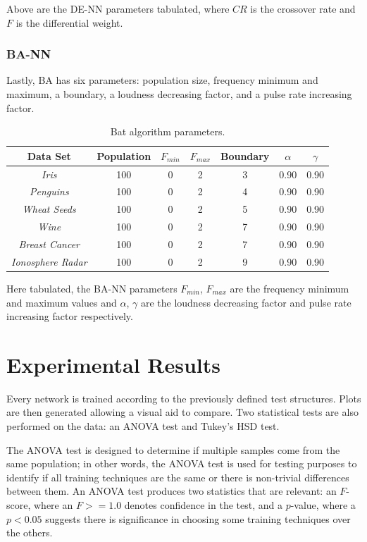\documentclass[a4paper,12pt]{article}
\begin{document}
Above are the DE-NN parameters tabulated, where $CR$ is the crossover rate and $F$ is the differential weight.

\subsubsection{BA-NN}

Lastly, BA has six parameters: population size, frequency minimum and maximum, a boundary, a loudness decreasing factor, and a pulse rate increasing factor.

\begin{table}[h!]
\centering
\begin{tabular}{|c|c|c|c|c|c|c|}
\hline
\textbf{Data Set} & \textbf{Population} & \textbf{$F_{min}$} & \textbf{$F_{max}$} & \textbf{Boundary} & \textbf{$\alpha$} & \textbf{$\gamma$} \\ \hline
\textit{Iris} & 100 & 0 & 2 & 3 & 0.90 & 0.90 \\ \hline
\textit{Penguins} & 100 & 0 & 2 & 4 & 0.90 & 0.90 \\ \hline
\textit{Wheat Seeds} & 100 & 0 & 2 & 5 & 0.90 & 0.90 \\ \hline
\textit{Wine} & 100 & 0 & 2 & 7 & 0.90 & 0.90 \\ \hline
\textit{Breast Cancer} & 100 & 0 & 2 & 7 & 0.90 & 0.90 \\ \hline
\textit{Ionosphere Radar} & 100 & 0 & 2 & 9 & 0.90 & 0.90 \\ \hline
\end{tabular}
\caption{Bat algorithm parameters.}
\label{Tab:ba-par}
\end{table}

Here tabulated, the BA-NN parameters $F_{min}$, $F_{max}$ are the frequency minimum and maximum values and $\alpha$, $\gamma$ are the loudness decreasing factor and pulse rate increasing factor respectively.

\section{Experimental Results}

Every network is trained according to the previously defined test structures. Plots are then generated allowing a visual aid to compare. Two statistical tests are also performed on the data: an ANOVA test and Tukey's HSD test.

The ANOVA test is designed to determine if multiple samples come from the same population; in other words, the ANOVA test is used for testing purposes to identify if all training techniques are the same or there is non-trivial differences between them. An ANOVA test produces two statistics that are relevant: an $F$-score, where an $F >= 1.0$ denotes confidence in the test, and a $p$-value, where a $p <0.05$ suggests there is significance in choosing some training techniques over the others.
\end{document}
